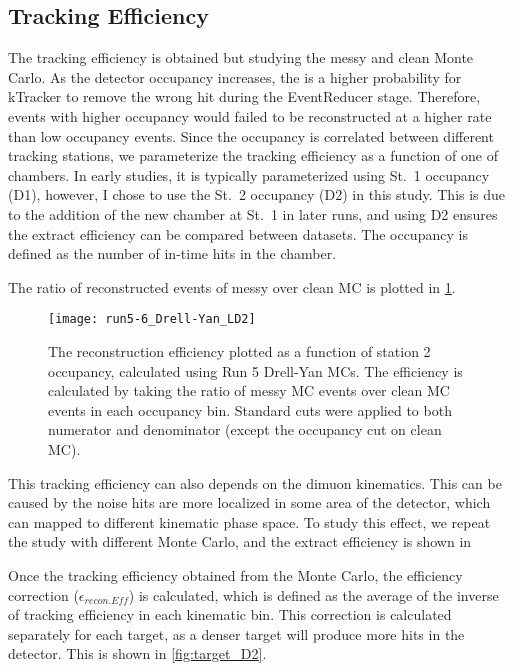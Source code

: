 \documentclass[../main.tex]{subfiles}
\begin{document}
\subsection{Tracking Efficiency}
The tracking efficiency is obtained but studying the messy and clean Monte Carlo.
As the detector occupancy increases, the is a higher probability for kTracker to
remove the wrong hit during the EventReducer stage. Therefore, events with higher occupancy
would failed to be reconstructed at a higher rate than low occupancy events. Since the occupancy
is correlated between different tracking stations, we parameterize the tracking efficiency
as a function of one of chambers. In early studies, it is typically parameterized using St.~1
occupancy (D1), however, I chose to use the St.~2 occupancy (D2) in this study. This
is due to the addition of the new chamber at St.~1 in later runs, and using D2 ensures the
extract efficiency can be compared between datasets. The occupancy is defined as the number of
in-time hits in the chamber.

The ratio of reconstructed events of messy over clean MC is plotted in \cref{fig:tracking efficiency}.
\begin{figure}[h!]
	\centering
	\texttt{[image: run5-6\_Drell-Yan\_LD2]}
	\caption{The reconstruction efficiency plotted as a function of station 2 occupancy, calculated using
		Run 5  Drell-Yan MCs.
		The efficiency is calculated by taking the ratio of messy MC events over clean MC events in each
		occupancy bin. Standard cuts were applied to both numerator and denominator
		(except the occupancy cut on clean MC).
	}
	\label{fig:tracking efficiency}
\end{figure}

This tracking efficiency can also depends on the dimuon kinematics. This can be caused
by the noise hits are more localized in some area of the detector, which can mapped to
different kinematic phase space. To study this effect, we repeat the study with different
Monte Carlo, and the extract efficiency is shown in

Once the tracking efficiency obtained from the Monte Carlo, the efficiency correction ($\epsilon_{recon.Eff}$)
is calculated, which is defined as the average of the inverse of tracking efficiency in each
kinematic bin. This correction is calculated separately for each target, as a denser target
will produce more hits in the detector. This is shown in \cref{fig:target_D2}.
\end{document}
